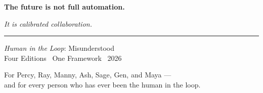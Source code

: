 \documentclass[12pt, a4paper]{article}
\newcommand{\amberrule}{%
  {\color{rulecolor}\rule{\linewidth}{0.5pt}}%
}
\newcommand{\seriesname}{\textit{Human in the Loop}}
\begin{document}
\vspace{12pt}

\begin{tcolorbox}[
  enhanced,
  colback=amberlight,
  colframe=amber,
  arc=4pt,
  boxrule=0.7pt,
  left=16pt, right=16pt,
  top=14pt, bottom=14pt,
]
\begin{center}
{\large\bfseries\color{charcoal} The future is not full automation.}

\vspace{6pt}
{\large\itshape\color{amberdeep} It is calibrated collaboration.}

\vspace{10pt}
\amberrule
\vspace{10pt}

{\small\color{midgrey} \seriesname: Misunderstood}\\[3pt]
{\small\color{midgrey} Four Editions \textbullet\ One Framework \textbullet\ 2026}
\end{center}
\end{tcolorbox}

\vspace*{\fill}

\begin{center}
{\footnotesize\color{midgrey}\sffamily For Percy, Ray, Manny, Ash, Sage, Gen, and Maya —\\
and for every person who has ever been the human in the loop.}
\end{center}

\end{document}
